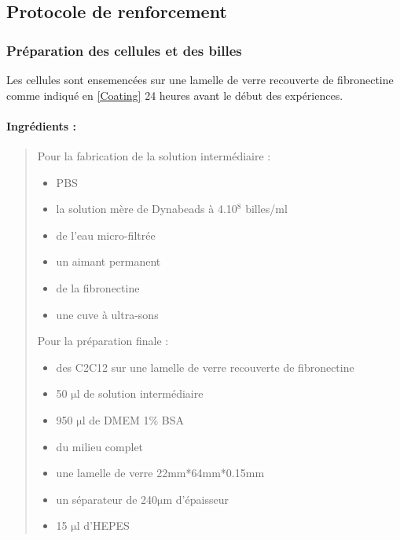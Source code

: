 \documentclass{report}
\newcommand{\micro}{$\mathrm{\mu}$}
\begin{document}
	
	\subsection{Protocole de renforcement}
	\subsubsection{Préparation des cellules et des billes}
	
	Les cellules sont ensemencées sur une lamelle de verre recouverte de fibronectine comme indiqué en \ref{Coating} 24 heures avant le début des expériences. 
	
	\paragraph{Ingrédients : }
	\begin{quote}
	Pour la fabrication de la solution intermédiaire : 
	\begin{itemize}
	\item PBS
	\item la solution mère de Dynabeads à 4.10$^{8}$ billes/ml
	\item de l'eau micro-filtrée 
	\item un aimant permanent
	\item de la fibronectine
	\item une cuve à ultra-sons
	\end{itemize}
	Pour la préparation finale : 
	\begin{itemize}
	\item des C2C12 sur une lamelle de verre recouverte de fibronectine
	\item 50 \micro l de solution intermédiaire
	\item 950 \micro l de DMEM 1\% BSA
	\item du milieu complet
	\item une lamelle de verre 22mm*64mm*0.15mm
	\item un séparateur de 240\micro m d'épaisseur
	\item 15 \micro l d'HEPES
	\end{itemize}
	\end{quote}
	
\end{document}
